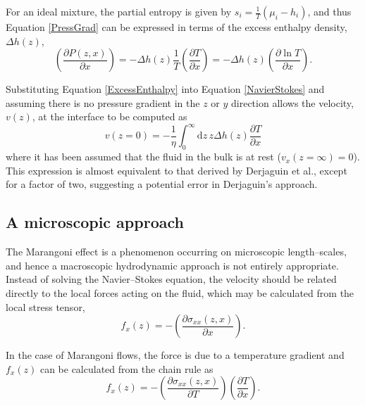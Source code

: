 For an ideal mixture, the partial entropy is given by $s_{i}=\frac{1}{T} \left(\mu_{i}-h_{i} \right)$, and thus Equation \ref{PressGrad} can be expressed in terms of the excess enthalpy density, $\Delta h(z)$,
\begin{equation}
\label{ExcessEnthalpy}
\left(\frac{\partial P(z,x)}{\partial x}\right)= - \Delta h(z)\frac{1}{T} \left( \frac{\partial T}{\partial x} \right) 
= - \Delta h(z) \left( \frac{\partial \ln T}{\partial x} \right).
\end{equation}

Substituting Equation \ref{ExcessEnthalpy} into Equation \ref{NavierStokes} and assuming there is no pressure gradient in the $z$ or $y$ direction allows the velocity, $v(z)$, at the interface to be computed as
\begin{equation}
\label{DoubleIntegral}
v (z=0) = - \frac{1}{\eta}\int_{0}^{\infty} \mathrm{d}z\, z \Delta h(z) \frac{\partial T}{\partial x}
\end{equation}
where it has been assumed that the fluid in the bulk is at rest ($v_{x}(z=\infty)=0$).
This expression is almost equivalent to that derived by Derjaguin et al., except for a factor of two, suggesting a potential error in Derjaguin's approach.\cite{SurfaceForces, Anderson}

\subsection{A microscopic approach}
The Marangoni effect is a phenomenon occurring on microscopic length--scales, and hence a macroscopic hydrodynamic approach is not entirely appropriate.
Instead of solving the Navier--Stokes equation, the velocity should be related directly to the local forces acting on the fluid, which may be calculated from the local stress tensor,
\begin{equation}
\label{ForceStress}
f_{x}(z) = - \left( \frac{\partial \sigma_{xx}(z,x)}{\partial x} \right).
\end{equation}

In the case of Marangoni flows, the force is due to a temperature gradient and $f_{x}(z)$ can be calculated from the chain rule as
\begin{equation}
\label{ForceStressTemp}
f_{x}(z) = - \left( \frac{\partial \sigma_{xx}(z,x)}{\partial T} \right) \left( \frac{\partial T}{\partial x} \right).
\end{equation}

